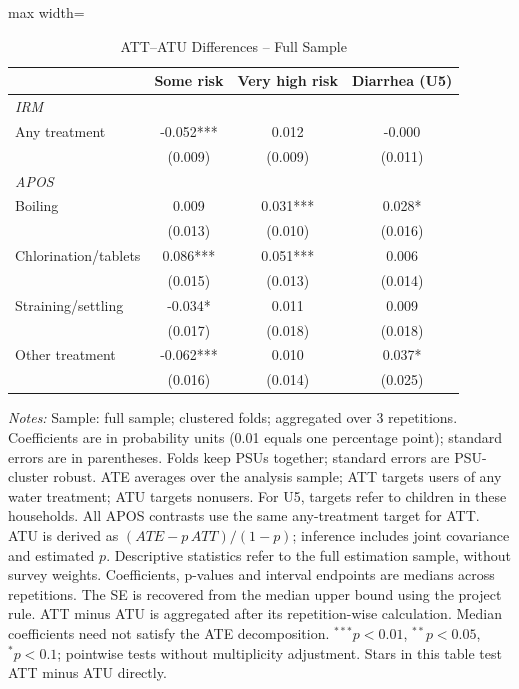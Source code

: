 \begin{table}[htbp]
\centering
\caption{ATT--ATU Differences -- Full Sample}
\label{tab:ate-att-atu-clustered-aggregated-difference}
\scriptsize
\setlength{\tabcolsep}{4pt}
\renewcommand{\arraystretch}{0.92}
\begin{adjustbox}{max width=\linewidth}
\begin{tabular}{lccc}
\hline\hline
 & Some risk & Very high risk & Diarrhea (U5) \\
\midrule
\multicolumn{4}{l}{\textit{IRM}} \\
Any treatment & -0.052*** & 0.012 & -0.000 \\
 & (0.009) & (0.009) & (0.011) \\
\midrule
\multicolumn{4}{l}{\textit{APOS}} \\
Boiling & 0.009 & 0.031*** & 0.028* \\
 & (0.013) & (0.010) & (0.016) \\
Chlorination/tablets & 0.086*** & 0.051*** & 0.006 \\
 & (0.015) & (0.013) & (0.014) \\
Straining/settling & -0.034* & 0.011 & 0.009 \\
 & (0.017) & (0.018) & (0.018) \\
Other treatment & -0.062*** & 0.010 & 0.037* \\
 & (0.016) & (0.014) & (0.025) \\
\hline\hline
\end{tabular}
\end{adjustbox}
\par\vspace{3pt}
\begin{minipage}{\linewidth}\scriptsize \textit{Notes:} Sample: full sample; clustered folds; aggregated over 3 repetitions. Coefficients are in probability units (0.01 equals one percentage point); standard errors are in parentheses. Folds keep PSUs together; standard errors are PSU-cluster robust. ATE averages over the analysis sample; ATT targets users of any water treatment; ATU targets nonusers. For U5, targets refer to children in these households. All APOS contrasts use the same any-treatment target for ATT. ATU is derived as $(ATE-p\,ATT)/(1-p)$; inference includes joint covariance and estimated $p$. Descriptive statistics refer to the full estimation sample, without survey weights. Coefficients, p-values and interval endpoints are medians across repetitions. The SE is recovered from the median upper bound using the project rule. ATT minus ATU is aggregated after its repetition-wise calculation. Median coefficients need not satisfy the ATE decomposition. $^{***}p<0.01$, $^{**}p<0.05$, $^{*}p<0.1$; pointwise tests without multiplicity adjustment. Stars in this table test ATT minus ATU directly.\end{minipage}
\end{table}
